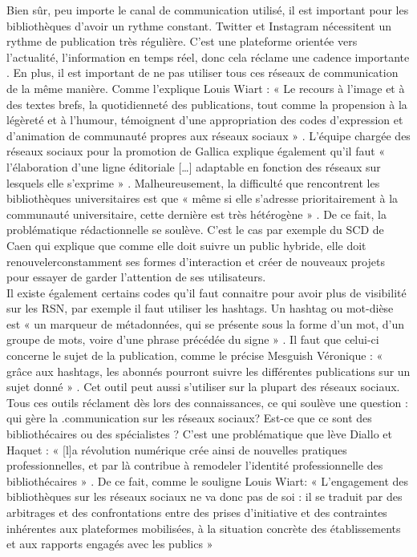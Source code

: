 \documentclass[a4paper,11pt]{article} %
\begin{document}
Bien sûr, peu importe le canal de communication utilisé, il est important pour les bibliothèques d’avoir un rythme constant. Twitter et Instagram nécessitent un rythme de publication très régulière. C’est une plateforme orientée vers l’actualité, l’information en temps réel, donc cela réclame une cadence importante \citep{mesguich2021chapitre,}. En plus, il est important de ne pas utiliser tous ces réseaux de communication de la même manière. Comme l’explique Louis Wiart : «
Le recours à l’image et à des textes brefs, la quotidienneté des publications, tout comme la propension à la légèreté et à l’humour, témoignent d’une appropriation des codes d’expression et d’animation de communauté propres aux réseaux sociaux » \citep{bar1960r,}. L’équipe chargée des réseaux sociaux pour la promotion de Gallica explique également qu’il faut «
l’élaboration d’une ligne éditoriale […] adaptable en fonction des réseaux sur lesquels elle s’exprime » \citep{leroy2012bibliotheque,}. Malheureusement, la difficulté que rencontrent les bibliothèques universitaires est que « même si elle s’adresse prioritairement à la communauté universitaire, cette dernière est très hétérogène » \citep{hugot2017albert,}. De ce fait, la problématique rédactionnelle se soulève. C’est le cas par exemple du SCD de Caen qui explique que comme elle doit suivre un public hybride, elle doit renouvelerconstamment ses formes d’interaction et créer de nouveaux projets pour essayer de garder l’attention de ses utilisateurs.\citep{chuiton2018construire,}\\

Il existe également certains codes qu’il faut connaitre pour avoir plus de visibilité sur les RSN, par exemple il faut utiliser les hashtags. Un hashtag ou mot-dièse est « un marqueur de métadonnées, qui se présente sous la forme d’un mot, d’un groupe de mots, voire d’une phrase précédée du signe » \citep{mesguich2017bibliotheques,}. Il faut que celui-ci concerne le sujet de la publication, comme le précise Mesguish Véronique : « grâce aux hashtags, les abonnés pourront suivre les différentes publications sur un sujet donné » .\citep{mesguich2017bibliotheques,} Cet outil peut aussi s’utiliser sur la plupart des réseaux sociaux.\\
Tous ces outils réclament dès lors des connaissances, ce qui soulève une question : qui 
gère la .communication sur les réseaux sociaux? Est-ce que ce sont des bibliothécaires ou des spécialistes
? C’est une problématique que lève Diallo et Haquet : « [l]a révolution numérique crée ainsi de nouvelles pratiques professionnelles, et par là contribue à remodeler l’identité professionnelle des bibliothécaires » \citep{mesguich2017bibliotheques,}. De ce fait, comme le souligne Louis Wiart: « L’engagement des bibliothèques sur les réseaux sociaux ne va donc pas de soi : il se traduit par des arbitrages et des confrontations entre des prises d’initiative et des contraintes inhérentes aux plateformes mobilisées, à la situation concrète des établissements et aux rapports engagés avec les publics » \citep{wiart2019presence,}\\
\end{document}
